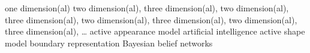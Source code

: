 \abbrv[1D]    one dimension(al)
\abbrv[2D, 3D, \dots]
              two dimension(al), three dimension(al), two dimension(al),
              three dimension(al), two dimension(al), three
              dimension(al), two dimension(al), three dimension(al), \dots
\abbrv[AAM]   active appearance model
\abbrv[AI]    artificial intelligence
\abbrv[ASM]   active shape model
\abbrv[B-rep] boundary representation
\abbrv[BBN]   Bayesian belief networks
\stopAbbreviations

\endinput
